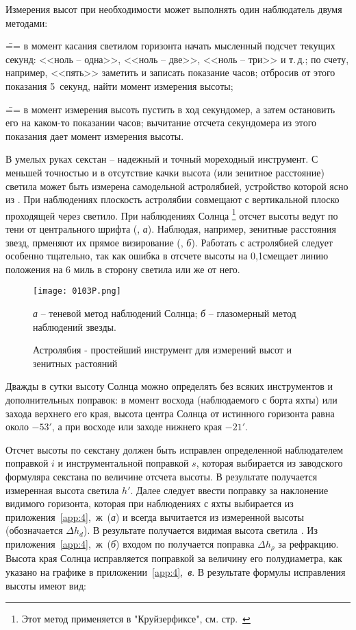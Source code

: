 Измерения высот при необходимости может выполнять один наблюдатель двумя методами:

\=== в момент касания светилом горизонта начать мысленный подсчет
текущих секунд: <<ноль \--- одна>>, <<ноль \--- две>>, <<ноль \---
три>> и т.\,д.; по счету, например, <<пять>> заметить и записать
показание часов; отбросив от этого показания 5~секунд, найти момент
измерения высоты;

\=== в момент измерения высоть пустить в ход секундомер, а затем остановить
его на каком-то показании часов; вычитание отсчета секундомера из
этого показания дает момент измерения высоты.

В умелых руках секстан \--- надежный и точный мореходный инструмент. С
меньшей точностью и в отсутствие качки высота (или зенитное
расстояние) светила может быть измерена самодельной астролябией,
устройство которой ясно из . При наблюдениях плоскость
астролябии совмещают с вертикальной плоско проходящей через
светило. При наблюдениях Солнца \footnote{Этот метод применяется в
  "Круйзерфиксе", см. стр.~\pageref{cruiserfix}} отсчет высоты ведут
по тени от центрального шрифта (, \textit{а}). Наблюдая,
например, зенитные расстояния звезд, прменяют их прямое визирование
(, \textit{б}). Работать с астролябией следует особенно
тщательно, так как ошибка в отсчете высоты на 0,1\gr смещает линию
положения на 6 миль в сторону светила или же от него.

\begin{figure}[!htb]
  \centering
  \texttt{[image: 0103P.png]}
  \caption[Астролябия]{Астролябия \-- простейший инструмент для измерений высот и зенитных pастояний}
  \label{fig:103}
  \small
  \textit{а} \--- теневой метод наблюдений Солнца;
  \textit{б} \--- глазомерный метод наблюдений звезды.
\end{figure}

Дважды в сутки высоту Солнца можно определять без всяких инструментов
и дополнительных поправок: в момент восхода (наблюдаемого с борта
яхты) или захода верхнего его края, высота центра Солнца от истинного
горизонта равна около $-53'$, а при восходе или заходе нижнего края
$-21'$.

Отсчет высоты по секстану должен быть исправлен определенной
наблюдателем поправкой $i$ и инструментальной поправкой $s$, которая
выбирается из заводского формуляра секстана по величине отсчета
высоты. В результате получается измеренная высота светила $h'$. Далее
следует ввести поправку за наклонение видимого горизонта, которая при
наблюдениях с яхты выбирается из
приложения~\ref{app:4},~ж~(\textit{а}) и всегда вычитается из
измеренной высоты (обозначается $\Delta h_d$). В результате получается
видимая высота светила . Из
приложения~\ref{app:4},~ж~(\textit{б}) входом по 
получается поправка $\Delta h_{\rho}$ за рефракцию. Высота края Солнца
исправляется поправкой за величину его полудиаметра, как указано на
графике в приложении~\ref{app:4},~\textit{в}. В результате формулы
исправления высоты имеют вид:

